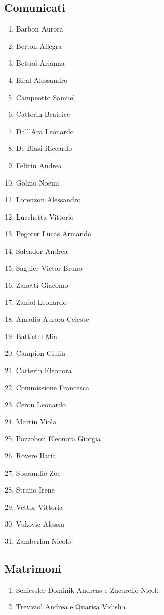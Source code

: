\subsection{Comunicati}
\begin{multicols}{2}
\begin{enumerate}
  \item Barbon Aurora
  \item Berton Allegra
  \item Bettiol Arianna
  \item Biral Alessandro
  \item Campeotto Samuel
  \item Catterin Beatrice
  \item Dall'Ara Leonardo
  \item De Biasi Riccardo
  \item Feltrin Andrea
  \item Golino Noemi
  \item Lorenzon Alessandro
  \item Lucchetta Vittorio
  \item Pegorer Lucas Armando
  \item Salvador Andrea
  \item Saguier Victor Bruno
  \item Zanetti Giacomo
  \item Zaniol Leonardo
  \item Amadio Aurora Celeste
  \item Battistel Mia
  \item Campion Giulia
  \item Catterin Eleonora
  \item Commissione Francesca
  \item Ceron Leonardo
  \item Martin Viola
  \item Pozzobon Eleonora Giorgia
  \item Rovere Ilaria
  \item Sperandio Zoe
  \item Strano Irene
  \item Vettor Vittoria
  \item Vukovic Alessia
  \item Zamberlan Nicolo'
\end{enumerate}
\end{multicols}

\subsection{Matrimoni}
\begin{enumerate}
  \item Schiessler Dominik Andreas e Zucarello Nicole
  \item Trevisiol Andrea e Quarisa Vidisha
\end{enumerate}

